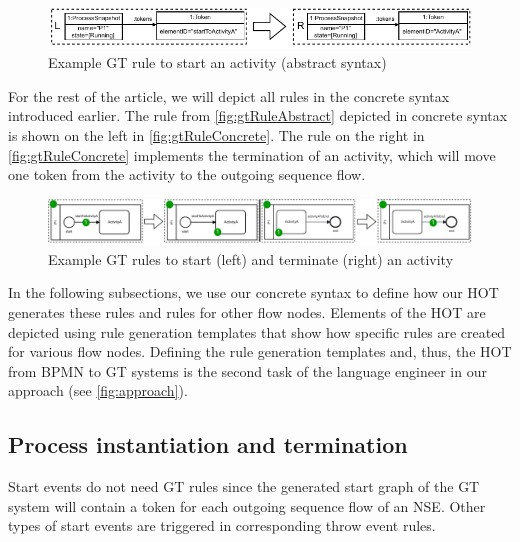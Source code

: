 \documentclass{lmcs} %
\begin{document}
\begin{figure}[ht]
    \centering
  \includegraphics[width=1\textwidth]{images/rule_abstract.pdf}
  \caption{Example GT rule to start an activity (abstract syntax)}  \label{fig:gtRuleAbstract}
\end{figure}

For the rest of the article, we will depict all rules in the concrete syntax introduced earlier.
The rule from \autoref{fig:gtRuleAbstract} depicted in concrete syntax is shown on the left in \autoref{fig:gtRuleConcrete}.
The rule on the right in \autoref{fig:gtRuleConcrete} implements the termination of an activity, which will move one token from the activity to the outgoing sequence flow.

\begin{figure}[ht]
    \centering
  \includegraphics[width=1\textwidth]{images/rule_concrete.pdf}
  \caption{Example GT rules to start (left) and terminate (right) an activity}
  \label{fig:gtRuleConcrete}
\end{figure}

In the following subsections, we use our concrete syntax to define how our HOT generates these rules and rules for other flow nodes.
Elements of the HOT are depicted using rule generation templates that show how specific rules are created for various flow nodes.
Defining the rule generation templates and, thus, the HOT from BPMN to GT systems is the second task of the language engineer in our approach (see \autoref{fig:approach}).

\subsection{Process instantiation and termination} \label{subsec:instAndTermination}

Start events do not need GT rules since the generated start graph of the GT system will contain a token for each outgoing sequence flow of an NSE.
Other types of start events are triggered in corresponding throw event rules.
\end{document}
